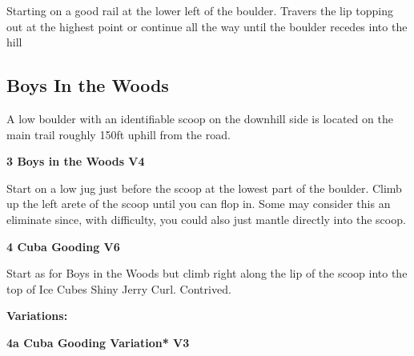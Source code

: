 \begin{multicols}{2}
\begin{minipage}{\linewidth}
					\begin{adjustwidth}{0.5cm}{}				
					Starting on a good rail at the lower left of the boulder. Travers the lip topping out at the highest point or continue all the way until the boulder recedes into the hill
					\end{adjustwidth}
					\end{minipage}

			\begin{minipage}{\columnwidth}
			\subsection*{Boys In the Woods}\label{bf:Boys In the Woods}
			A low boulder with an identifiable scoop on the downhill side is located on the main trail roughly 150ft uphill from the road.
			
			\end{minipage}
			
					\begin{minipage}{\linewidth}	
					\label{rt:Boys in the Woods}
\colorbox{RoyalBlue!20}{
\parbox{0.95\textwidth}{
\textbf{
3 Boys in the Woods V4    
}
}
}

					\begin{adjustwidth}{0.5cm}{}				
					Start on a low jug just before the scoop at the lowest part of the boulder. Climb up the left arete of the scoop until you can flop in. Some may consider this an eliminate since, with difficulty, you could also just mantle directly into the scoop.
					\end{adjustwidth}
					\end{minipage}
					\begin{minipage}{\linewidth}	
					\label{rt:Cuba Gooding}
\colorbox{RoyalBlue!20}{
\parbox{0.95\textwidth}{
\textbf{
4 Cuba Gooding V6    
}
}
}

					\begin{adjustwidth}{0.5cm}{}				
					Start as for Boys in the Woods but climb right along the lip of the scoop into the top of Ice Cubes Shiny Jerry Curl. Contrived.
					\end{adjustwidth}
					\end{minipage}
						\begin{adjustwidth}{0.5cm}{}				
						\textbf{Variations:} \newline
							\begin{minipage}{\linewidth}	
							\label{vr:Cuba Gooding Variation}
\colorbox{green!20}{
\parbox{0.95\textwidth}{
\textbf{
4a Cuba Gooding Variation* V3   
}
}
}


\end{minipage}
\end{adjustwidth}
\end{multicols}
